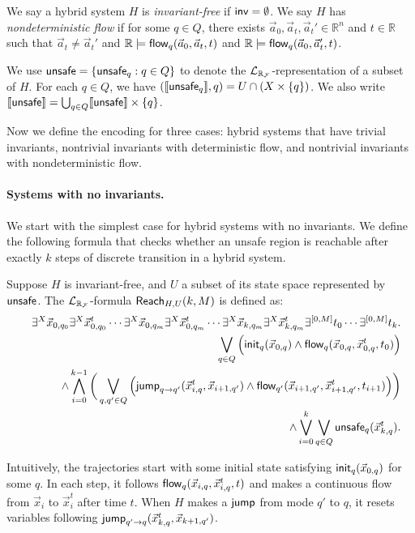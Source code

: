 \documentclass[12pt]{article}
\begin{document}
We say a hybrid system $H$ is {\em invariant-free} if $\mathsf{inv} = \emptyset$. We say $H$ has {\em nondeterministic flow} if for some $q\in Q$, there exists $\vec a_0, \vec a_t, \vec a_t'\in \mathbb{R}^n$ and $t\in\mathbb{R}$ such that $\vec a_t\neq \vec a_t'$ and $\mathbb{R}\models \mathsf{flow}_q(\vec a_0, \vec a_t, t)$ and $\mathbb{R}\models \mathsf{flow}_q(\vec a_0, \vec a_t', t)$.

\begin{definition}
We use $\mathsf{unsafe} = \{\mathsf{unsafe}_q:q\in Q\}$ to denote the $\mathcal{L}_{\mathbb{R}_{\mathcal{F}}}$-representation of a subset of $H$. For each $q\in Q$, we have $(\llbracket \mathsf{unsafe}_q\rrbracket, q) = U\cap (X\times \{q\})$. We also write $\llbracket \mathsf{unsafe}\rrbracket = \bigcup_{q\in Q} \llbracket \mathsf{unsafe} \rrbracket\times \{q\}$. 
\end{definition}

Now we define the encoding for three cases: hybrid systems that have trivial invariants, nontrivial invariants with deterministic flow, and nontrivial invariants with nondeterministic flow.

\paragraph{Systems with no invariants.} We start with the simplest case for hybrid systems with no invariants. We define the following formula that checks whether an unsafe region is reachable after exactly $k$ steps of discrete transition in a hybrid system.

\begin{definition}
Suppose $H$ is invariant-free, and $U$ a subset of its state space represented by $\mathsf{unsafe}$. The $\mathcal{L}_{\mathbb{R}_{\mathcal{F}}}$-formula $\mathsf{Reach}_{H,U}(k,M)$ is defined as:
\begin{eqnarray*}
& &\exists^X \vec x_{0,q_0} \exists^X\vec x_{0,q_0}^t\cdots \exists^X\vec
x_{0,q_m}\exists^X \vec x_{0,q_m}^t\cdots\exists^X \vec x_{k,q_m}\exists^X\vec x_{k,q_m}^t\exists^{[0,M]}t_0\cdots \exists^{[0,M]}t_k.\\
& &\bigvee_{q\in Q} \Big(\mathsf{init}_{q}(\vec x_{0,q})\wedge \mathsf{flow}_{q}(\vec x_{0,q}, \vec x_{0,q}^t, t_0)\Big)\\
& &\wedge \bigwedge_{i=0}^{k-1}\bigg( \bigvee_{q, q'\in Q} \Big(\mathsf{jump}_{q\rightarrow q'}(\vec x_{i,q}^t, \vec x_{i+1,q'})\wedge \mathsf{flow}_{q'}(\vec x_{i+1,q'}, \vec x_{i+1,q'}^t, t_{i+1})\Big)\bigg)\\
& &\wedge \bigvee_{i=0}^k\bigvee_{q\in Q} \mathsf{unsafe}_q(\vec x_{k,q}^t).
\end{eqnarray*}
\end{definition}
Intuitively, the trajectories start with some initial state satisfying $\mathsf{init}_q(\vec x_{0,q})$ for some $q$. In each step, it follows $\mathsf{flow}_q(\vec x_{i,q}, \vec x_{i,q}^t, t)$ and makes a continuous flow from $\vec x_i$ to $\vec x_i^t$ after time $t$. When $H$ makes a $\mathsf{jump}$ from mode $q'$ to $q$, it resets variables following $\mathsf{jump}_{q'\rightarrow q}(\vec x_{k,q}^t, \vec x_{k+1,q'})$.
\end{document}
